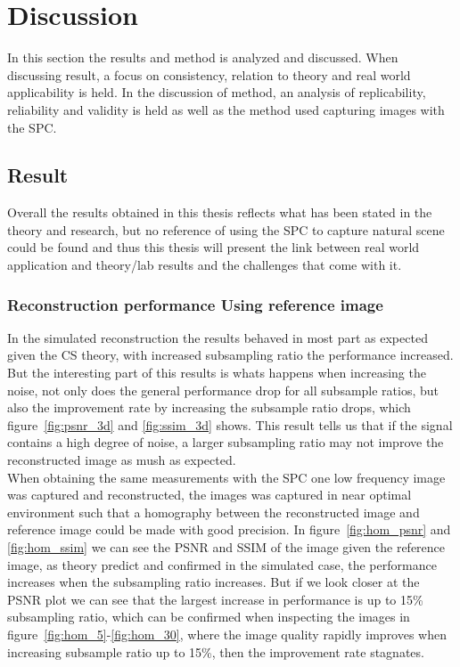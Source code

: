 \section{Discussion} %
\label{sec:discussion}
In this section the results and method is analyzed and discussed. When discussing result, a focus on consistency, relation to theory and real world applicability is held. In the discussion of method, an analysis of replicability, reliability and  validity is held as well as the method used capturing images with the SPC.

\subsection{Result} 
Overall the results obtained in this thesis reflects what has been stated in the theory and research, but no reference of using the SPC to capture natural scene could be found and thus this thesis will present the link between real world application and theory/lab results and the challenges that come with it. 



\subsubsection{Reconstruction performance Using reference image}
\label{sec:anlys_ref_im}

In the simulated reconstruction the results behaved in most part as expected given the CS theory, with increased subsampling ratio the performance increased. But the interesting part of this results is whats happens when increasing the noise, not only does the general performance drop for all subsample ratios, but also the improvement rate by increasing the subsample ratio drops, which figure~\ref{fig:psnr_3d} and \ref{fig:ssim_3d} shows. This result tells us that if the signal contains a high degree of noise, a larger subsampling ratio may not improve the reconstructed image as mush as expected.\\[0.1in]

When obtaining the same measurements with the SPC one low frequency image was captured and reconstructed, the images was captured in near optimal environment such that a homography between the reconstructed image and reference image could be made with good precision. In figure~\ref{fig:hom_psnr} and \ref{fig:hom_ssim} we can see the PSNR and SSIM of the image given the reference image, as theory predict and confirmed in the simulated case, the performance increases when the subsampling ratio increases. But if we look closer at the PSNR plot we can see that the largest increase in performance is up to 15\% subsampling ratio, which can be confirmed when inspecting the images in figure~\ref{fig:hom_5}-\ref{fig:hom_30}, where the image quality rapidly improves when increasing subsample ratio up to 15\%, then the improvement rate stagnates.


